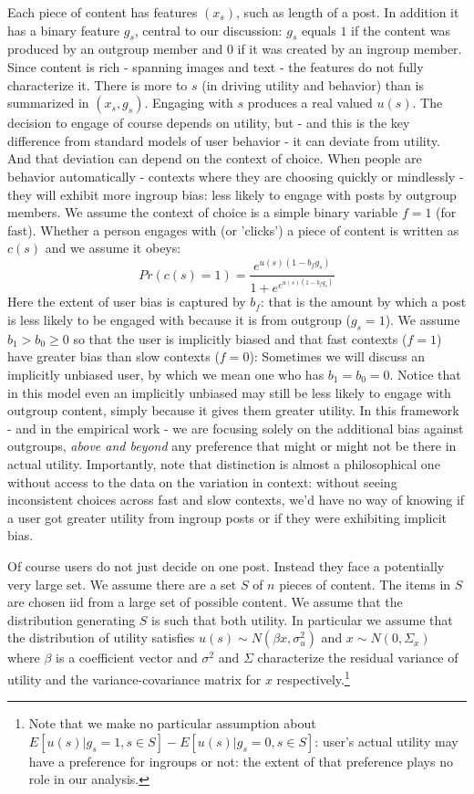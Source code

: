 \documentclass[12pt,letterpaper]{article}
\begin{document}
Each piece of content has features $(x_s)$, such as length of a post. In addition it has a binary feature $g_s$, central to our discussion: $g_s$ equals $1$ if the content was produced by an outgroup member and $0$ if it was created by an ingroup member. Since content is rich  - spanning images and text - the features do not fully characterize it. There is more to $s$ (in driving utility and behavior) than is summarized in $(x_s,g_s)$. Engaging with $s$ produces a real valued $u(s)$. The decision to engage of course depends on utility, but - and this is the key difference from standard models of user behavior - it can deviate from utility. And that deviation can depend on the context of choice. When people are behavior automatically - contexts where they are choosing quickly or mindlessly - they will exhibit more ingroup bias: less likely to engage with posts by outgroup members. We assume the context of choice is a simple binary variable $f=1$ (for fast). Whether a person engages with (or 'clicks') a piece of content is written as $c(s)$  and we assume it obeys: 
$$Pr(c(s) = 1) = \frac{e^{u(s)(1 - b_f g_s)}}{1+e^{e^{u(s)(1 - b_f g_s)}}}$$
Here the extent of user bias is captured by $b_f$: that is the amount by which a post is less likely to be engaged with because it is from outgroup ($g_s = 1$). We assume $b_1 > b_0 \geq 0$ so that the user is implicitly biased and that fast contexts ($f=1$) have greater bias than slow contexts ($f=0$):  Sometimes we will discuss an implicitly unbiased user, by which we mean one who has $b_1 = b_0 =  0$.  Notice that in this model even an implicitly unbiased may still be less likely to engage with outgroup content, 
simply because it gives them greater utility. In this framework - and in the empirical work - we are focusing solely on the additional bias against outgroups, \textit{above and beyond} any preference that might or might not be there in actual utility. Importantly, note that distinction is almost a philosophical one without access to the data on the variation in context: without seeing inconsistent choices across fast and slow contexts, we'd have no way of knowing if a user got greater utility from ingroup posts or if they were exhibiting implicit bias. 

Of course users do not just decide on one post. Instead they face a potentially very large set. We assume there are a set $S$ of $n$ pieces of content. The items in $S$ are chosen iid from a large set of possible content. We assume that the distribution generating $S$ is such that both utility. In particular we assume that 
the distribution of utility satisfies $u(s)\sim N(\beta x,\sigma^2_u)$ and $x\sim N(0,\Sigma_x)$ where $\beta$ is a coefficient vector and $\sigma^2$ and $\Sigma$ characterize the residual variance of utility and the variance-covariance matrix for $x$ respectively.\footnote{Note that we make no particular assumption about $E[u(s)|g_s=1,s\in S] -E[u(s)|g_s=0,s\in S]$: user's actual utility may have a preference for ingroups or not: the extent of that preference plays no role in our analysis.} 
\end{document}
